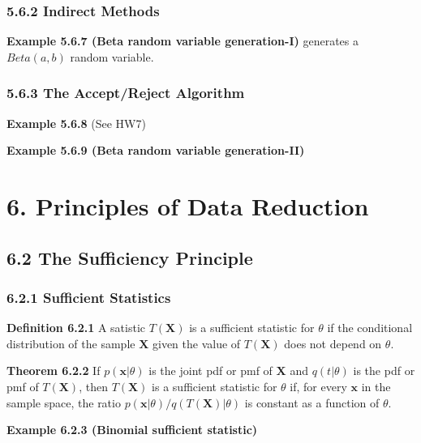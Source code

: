 \documentclass[6pt,Portrait]{article}
\begin{document}
\hypertarget{indirect-methods}{%
\subsubsection{5.6.2 Indirect Methods}\label{indirect-methods}}

\textbf{Example 5.6.7 (Beta random variable generation-I)} generates a
\(Beta(a,b)\) random variable.

\hypertarget{the-acceptreject-algorithm}{%
\subsubsection{5.6.3 The Accept/Reject
Algorithm}\label{the-acceptreject-algorithm}}

\textbf{Example 5.6.8} (See HW7)

\textbf{Example 5.6.9 (Beta random variable generation-II)}

\hypertarget{principles-of-data-reduction}{%
\section{6. Principles of Data
Reduction}\label{principles-of-data-reduction}}

\hypertarget{the-sufficiency-principle}{%
\subsection{6.2 The Sufficiency
Principle}\label{the-sufficiency-principle}}

\hypertarget{suff}{%
\subsubsection{6.2.1 Sufficient Statistics}\label{suff}}

\textbf{Definition 6.2.1} A satistic \(T(\mathbf{X})\) is a sufficient
statistic for \(\theta\) if the conditional distribution of the sample
\(\mathbf{X}\) given the value of \(T(\mathbf{X})\) does not depend on
\(\theta\).

\textbf{Theorem 6.2.2} If \(p(\mathbf{x}|\theta)\) is the joint pdf or
pmf of \(\mathbf{X}\) and \(q(t|\theta)\) is the pdf or pmf of
\(T(\mathbf{X})\), then \(T(\mathbf{X})\) is a sufficient statistic for
\(\theta\) if, for every \(\mathbf{x}\) in the sample space, the ratio
\(p(\mathbf{x}|\theta)/q(T(\mathbf{X})|\theta)\) is constant as a
function of \(\theta\).

\textbf{Example 6.2.3 (Binomial sufficient statistic)}
\end{document}
